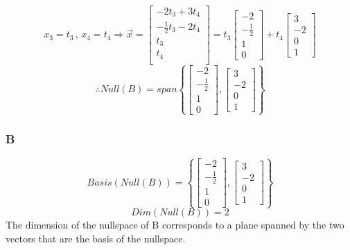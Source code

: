 \documentclass{article}
\begin{document}
\[
	x_3=t_3 \, , \, x_4=t_4 \Rightarrow \vec{x}=
	\begin{bmatrix}
		-2t_3 + 3t_4           \\
		-\frac{1}{2}t_3 - 2t_4 \\
		t_3                    \\
		t_4                    \\
	\end{bmatrix}
	=
	t_3
	\begin{bmatrix}
		-2           \\
		-\frac{1}{2} \\
		1            \\
		0
	\end{bmatrix}
	+
	t_4
	\begin{bmatrix}
		3  \\
		-2 \\
		0  \\
		1
	\end{bmatrix}
\]
\[
	\therefore Null(B)= span \left\{
	\begin{bmatrix}
		-2           \\
		-\frac{1}{2} \\
		1            \\
		0
	\end{bmatrix},
	\begin{bmatrix}
		3  \\
		-2 \\
		0  \\
		1
	\end{bmatrix}
	\right\}
\]

\subsubsection*{B}

\[
	Basis(Null(B))=\left\{
	\begin{bmatrix}
		-2           \\
		-\frac{1}{2} \\
		1            \\
		0
	\end{bmatrix},
	\begin{bmatrix}
		3  \\
		-2 \\
		0  \\
		1
	\end{bmatrix}
	\right\}
\]
\[
	Dim(Null(B)) = 2
\]
The dimension of the nullspace of B corresponds to a plane spanned by the two vectors that are the basis of the nullspace.
\end{document}
